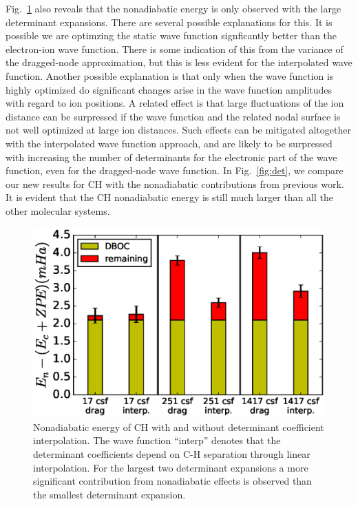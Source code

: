 \documentclass[aip,jcp,numerical,reprint]{revtex4-1}
\begin{document}
Fig.~\ref{fig:ch-interp} also reveals that the nonadiabatic energy is only observed with the large determinant expansions.  There are several possible explanations for this.  It is possible we are optimzing the static wave function signficantly better than the electron-ion wave function.  There is some indication of this from the variance of the dragged-node approximation, but this is less evident for the interpolated wave function.  Another possible explanation is that only when the wave function is highly optimized do significant changes arise in the wave function amplitudes with regard to ion positions.  A related effect is that large fluctuations of the ion distance can be surpressed if the wave function and the related nodal surface is not well optimized at large ion distances.  Such effects can be mitigated altogether with the interpolated wave function approach, and are likely to be surpressed with increasing the number of determinants for the electronic part of the wave function, even for the dragged-node wave function. In Fig.~\ref{fig:det}, we compare our new results for CH with the nonadiabatic contributions from previous work. It is evident that the CH nonadiabatic energy is still much larger than all the other molecular systems. %

\begin{figure}[h]
\includegraphics[scale=0.5]{ch-only}
\caption{Nonadiabatic energy of CH with and without determinant coefficient interpolation.  The wave function ``interp'' denotes that the determinant coefficients depend on C-H separation through linear interpolation. For the largest two determinant expansions a more significant contribution from nonadiabatic effects is observed than the smallest determinant expansion. \label{fig:ch-interp} }
\end{figure}
\end{document}
